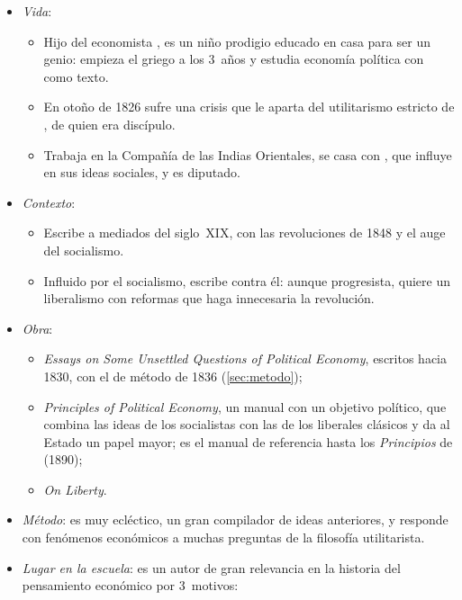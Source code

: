 \documentclass[11pt]{article}
\begin{document}
\begin{itemize}
\item \emph{Vida}:
  \begin{itemize}
  \item Hijo del economista ,  es un niño prodigio educado en casa para ser un genio: empieza el griego a los 3~años y estudia economía política con  como texto.
  \item En otoño de 1826 sufre una crisis que le aparta del utilitarismo estricto de , de quien era discípulo\nocite{Mill1873Autobiography}.
  \item Trabaja en la Compañía de las Indias Orientales, se casa con , que influye en sus ideas sociales, y es diputado.
  \end{itemize}
\item \emph{Contexto}:
  \begin{itemize}
  \item Escribe a mediados del siglo~XIX, con las revoluciones de 1848 y el auge del socialismo.
  \item Influido por el socialismo, escribe contra él: aunque progresista, quiere un liberalismo con reformas que haga innecesaria la revolución.
  \end{itemize}
\item \emph{Obra}:
  \begin{itemize}
  \item \emph{Essays on Some Unsettled Questions of Political Economy}\nocite{Mill1844Essays}, escritos hacia 1830, con el de método de 1836 (\ref{sec:metodo});
  \item \emph{Principles of Political Economy}\nocite{Mill1848Principles}, un manual con un objetivo político, que combina las ideas de los socialistas con las de los liberales clásicos y da al Estado un papel mayor; es el manual de referencia hasta los \emph{Principios} de  (1890);
  \item \emph{On Liberty}\nocite{Mill1859Liberty}.
  \end{itemize}
\item \emph{Método}:  es muy ecléctico, un gran compilador de ideas anteriores, y responde con fenómenos económicos a muchas preguntas de la filosofía utilitarista.
\item \emph{Lugar en la escuela}:  es un autor de gran relevancia en la historia del pensamiento económico por 3~motivos:
  \begin{itemize}

\end{itemize}
\end{itemize}
\end{document}
